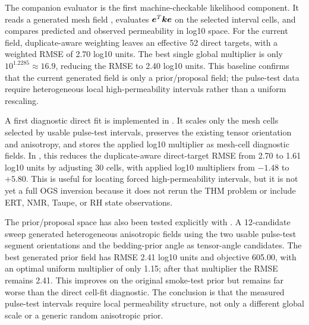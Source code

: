 The companion evaluator
 is the first
machine-checkable likelihood component.  It reads a generated mesh field
, evaluates \( \bm e^T\bm{k}\bm e \) on the selected interval cells, and
compares predicted and observed permeability in log10 space.  For the current
 field, duplicate-aware weighting leaves an effective 52 direct
targets, with a weighted RMSE of 2.70 log10 units.  The best single global multiplier
is only \(10^{1.2285}\approx16.9\), reducing the RMSE to 2.40 log10 units.  This
baseline confirms that the current generated field is only a prior/proposal field;
the pulse-test data require heterogeneous local high-permeability intervals rather
than a uniform rescaling.

A first diagnostic direct fit is implemented in
.  It scales
only the mesh cells selected by usable pulse-test intervals, preserves the existing
tensor orientation and anisotropy, and stores the applied log10 multiplier as mesh-cell
diagnostic fields.  In , this reduces the
duplicate-aware direct-target RMSE from 2.70 to 1.61 log10 units by adjusting 30 cells,
with applied log10 multipliers from \(-1.48\) to \(+5.80\).  This is useful for
locating forced high-permeability intervals, but it is not yet a full OGS inversion
because it does not rerun the THM problem or include ERT, NMR, Taupe, or RH state
observations.

The prior/proposal space has also been tested explicitly with
.  A 12-candidate sweep generated
heterogeneous anisotropic fields using the two usable pulse-test segment orientations
and the bedding-prior angle as tensor-angle candidates.  The best generated prior
field has RMSE 2.41 log10 units and objective 605.00, with an optimal uniform
multiplier of only 1.15; after that multiplier the RMSE remains 2.41.  This improves
on the original smoke-test prior but remains far worse than the direct cell-fit
diagnostic.  The conclusion is that the measured pulse-test intervals require local
permeability structure, not only a different global scale or a generic random
anisotropic prior.

